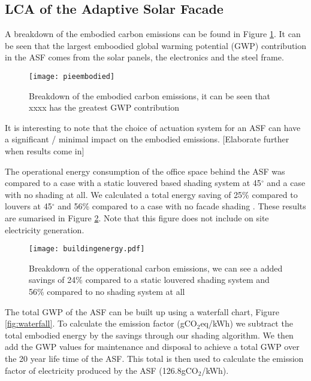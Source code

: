 
\subsection{LCA of the Adaptive Solar Facade}

A breakdown of the embodied carbon emissions can be found in Figure  \ref{fig:embodied}. It can be seen that the largest emboodied global warming potential (GWP) contribution in the ASF comes from the solar panels, the electronics and the steel frame. 

\begin{figure}[H]
\begin{center}
\texttt{[image: pieembodied]}
\caption{Breakdown of the embodied carbon emissions, it can be seen that xxxx has the greatest GWP contribution}
\label{fig:embodied}
\end{center}
\end{figure}


It is interesting to note that the choice of actuation system for an ASF can have a significant / minimal impact on the embodied emissions. [Elaborate further when results come in]

The operational energy consumption of the office space behind the ASF was compared to a case with a static louvered based shading system at 45$^\circ$ and a case with no shading at all. We calculated a total energy saving of 25\% compared to louvers at 45$^\circ$ and 56\% compared to a case with no facade shading \cite{jayathissa2015abs}. These results are sumarised in Figure \ref{fig:operational}. Note that this figure does not include on site electricity generation. 


\begin{figure}[H]
\begin{center}
\texttt{[image: buildingenergy.pdf]}
\caption{Breakdown of the opperational carbon emissions, we can see a added savings of 24\% compared to a static louvered shading system and 56\% compared to no shading system at all}
\label{fig:operational}
\end{center}
\end{figure}

The total GWP of the ASF can be built up using a waterfall chart, Figure \ref{fig:waterfall}. To calculate the emission factor (gCO$_2$eq/kWh) we subtract the total embodied energy by the savings through our shading algorithm. We then add the GWP values for maintenance and disposal to achieve a total GWP over the 20 year life time of the ASF. This total is then used to calculate the emission factor of electricity produced by the ASF (126.8gCO$_2$/kWh).\\

